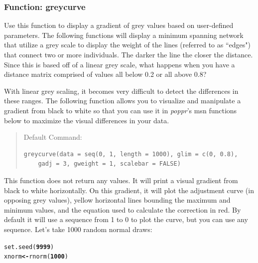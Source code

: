 \documentclass[letterpaper]{article}\usepackage[]{graphicx}\usepackage[]{color}
\makeatletter
\newcommand{\hlnum}[1]{\textcolor[rgb]{0.502,0,0.502}{\textbf{#1}}}%
\newcommand{\hlstd}[1]{\textcolor[rgb]{0,0,0}{#1}}%
\newcommand{\hlkwb}[1]{\textcolor[rgb]{0.502,0.502,0.753}{\textbf{#1}}}%
\newcommand{\hlkwd}[1]{\textcolor[rgb]{0,0.267,0.4}{#1}}%
\newenvironment{kframe}{%
 \def\at@end@of@kframe{}%
 \ifinner\ifhmode%
  \def\at@end@of@kframe{\end{minipage}}%
  \begin{minipage}{\columnwidth}%
 \fi\fi%
 \def\FrameCommand##1{\hskip\@totalleftmargin \hskip-\fboxsep
 \colorbox{shadecolor}{##1}\hskip-\fboxsep
     \hskip-\linewidth \hskip-\@totalleftmargin \hskip\columnwidth}%
 \MakeFramed {\advance\hsize-\width
   \@totalleftmargin\z@ \linewidth\hsize
   \@setminipage}}%
 {\par\unskip\endMakeFramed%
 \at@end@of@kframe}
\newenvironment{knitrout}{}{} %
\newcommand{\tab}{\hspace*{1em}}
\newcommand{\poppr}{\textit{poppr}}
\makeatother
\begin{document}
\subsubsection{Function: greycurve}
\label{index:trees:greycurve}
\tab\tab Use this function to display a gradient of grey values based on user-defined parameters. The following functions will display a minimum spanning network that utilize a grey scale to display the weight of the lines (referred to as ``edges") that connect two or more individuals. The darker the line the closer the distance. Since this is based off of a linear grey scale, what happens when you have a distance matrix comprised of values all below 0.2 or all above 0.8? 

With linear grey scaling, it becomes very difficult to detect the differences in these ranges. The following function allows you to visualize and manipulate a gradient from black to white so that you can use it in \poppr{}'s msn functions below to maximize the visual differences in your data.

\begin{quote}
Default Command:
\begin{knitrout}
\color{fgcolor}\begin{kframe}
\begin{verbatim}
greycurve(data = seq(0, 1, length = 1000), glim = c(0, 0.8), 
    gadj = 3, gweight = 1, scalebar = FALSE)
\end{verbatim}
\end{kframe}
\end{knitrout}

\end{quote}


This function does not return any values. It will print a visual gradient from black to white horizontally. On this gradient, it will plot the adjustment curve (in opposing grey values), yellow horizontal lines bounding the maximum and minimum values, and the equation used to calculate the correction in red. By default it will use a sequence from 1 to 0 to plot the curve, but you can use
any sequence. Let's take 1000 random normal draws:

\begin{knitrout}\footnotesize
{}\color{fgcolor}\begin{kframe}
\begin{alltt}
\hlkwd{set.seed}\hlstd{(}\hlnum{9999}\hlstd{)}
\hlstd{xnorm} \hlkwb{<-} \hlkwd{rnorm}\hlstd{(}\hlnum{1000}\hlstd{)}
\end{alltt}
\end{kframe}
\end{knitrout}
\end{document}
